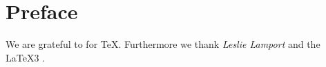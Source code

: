 \documentclass[12pt]{thesis}
\begin{document}
\chapter{Preface}

We are grateful to  for \TeX{}.
Furthermore we thank  \emph{Leslie Lamport}
and the \LaTeX3{} . 

\renewcommand{\indexname}{Nameindex}
\printnameindex
\end{document}
